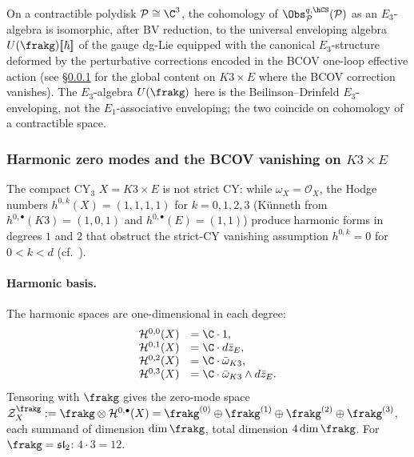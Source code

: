 \begin{remark}
\label{rem:local-bv-cohomology-polydisk}
On a contractible polydisk $\mathcal{P} \cong \C^3$, the cohomology of
$\Obs^{q,\hCS}_\mathcal{P}(\mathcal{P})$ as an $E_3$-algebra is
isomorphic, after BV reduction, to the universal enveloping algebra
$U(\frakg)[\![\hbar]\!]$ of the gauge dg-Lie equipped with the
canonical $E_3$-structure deformed by the perturbative corrections
encoded in the BCOV one-loop effective action \textup{(}see
\S\ref{subsubsec:zero-modes-k3xe} for the global content on
$K3 \times E$ where the BCOV correction vanishes\textup{).} The
$E_3$-algebra $U(\frakg)$ here is the Beilinson--Drinfeld $E_3$-enveloping,
not the $E_1$-associative enveloping; the two coincide on cohomology of
a contractible space.
\end{remark}

\subsubsection{Harmonic zero modes and the BCOV vanishing on \texorpdfstring{$K3 \times E$}{K3 x E}}
\label{subsubsec:zero-modes-k3xe}

The compact CY$_3$ $X = K3 \times E$ is not strict CY: while
$\omega_X = \mathcal{O}_X$, the Hodge numbers
$h^{0, k}(X) = (1, 1, 1, 1)$ for $k = 0, 1, 2, 3$
\textup{(K\"unneth from $h^{0, \bullet}(K3) = (1, 0, 1)$ and
$h^{0, \bullet}(E) = (1, 1)$)} produce harmonic forms in degrees $1$
and $2$ that obstruct the strict-CY vanishing assumption $h^{0, k} = 0$
for $0 < k < d$ \textup{(}cf.~\cite{CostelloLi2012}\textup{).}

\paragraph{Harmonic basis.}
The harmonic spaces are one-dimensional in each degree:
\begin{equation}
\label{eq:harmonic-basis-k3xe}
\begin{array}{rl}
\mathcal{H}^{0, 0}(X) &= \C \cdot 1, \\
\mathcal{H}^{0, 1}(X) &= \C \cdot d\bar z_E, \\
\mathcal{H}^{0, 2}(X) &= \C \cdot \bar\omega_{K3}, \\
\mathcal{H}^{0, 3}(X) &= \C \cdot \bar\omega_{K3} \wedge d\bar z_E.
\end{array}
\end{equation}
Tensoring with $\frakg$ gives the zero-mode space
$\mathcal{Z}_X^{\frakg} := \frakg \otimes \mathcal{H}^{0, \bullet}(X)
 = \frakg^{(0)} \oplus \frakg^{(1)} \oplus \frakg^{(2)} \oplus \frakg^{(3)}$,
each summand of dimension $\dim \frakg$, total dimension
$4 \dim \frakg$. For $\frakg = \mathfrak{sl}_2$: $4 \cdot 3 = 12$.

